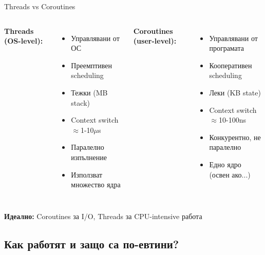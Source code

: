 \documentclass[aspectratio=169]{beamer}
\begin{document}
\begin{frame}{Threads vs Coroutines}
\begin{columns}
\textbf{Threads (OS-level):}
\begin{itemize}
    \item Управлявани от ОС
    \item Преемптивен scheduling
    \item Тежки (MB stack)
    \item Context switch $\approx$1-10$\mu$s
    \item Паралелно изпълнение
    \item Използват множество ядра
\end{itemize}

\textbf{Coroutines (user-level):}
\begin{itemize}
    \item Управлявани от програмата
    \item Кооперативен scheduling
    \item Леки (KB state)
    \item Context switch $\approx$10-100ns
    \item Конкурентно, не паралелно
    \item Едно ядро (освен ако...)
\end{itemize}
\end{columns}

\vspace{0.5cm}
\centering
\textbf{Идеално:} Coroutines за I/O, Threads за CPU-intensive работа
\end{frame}

\subsection{Как работят и защо са по-евтини?}
\end{document}
